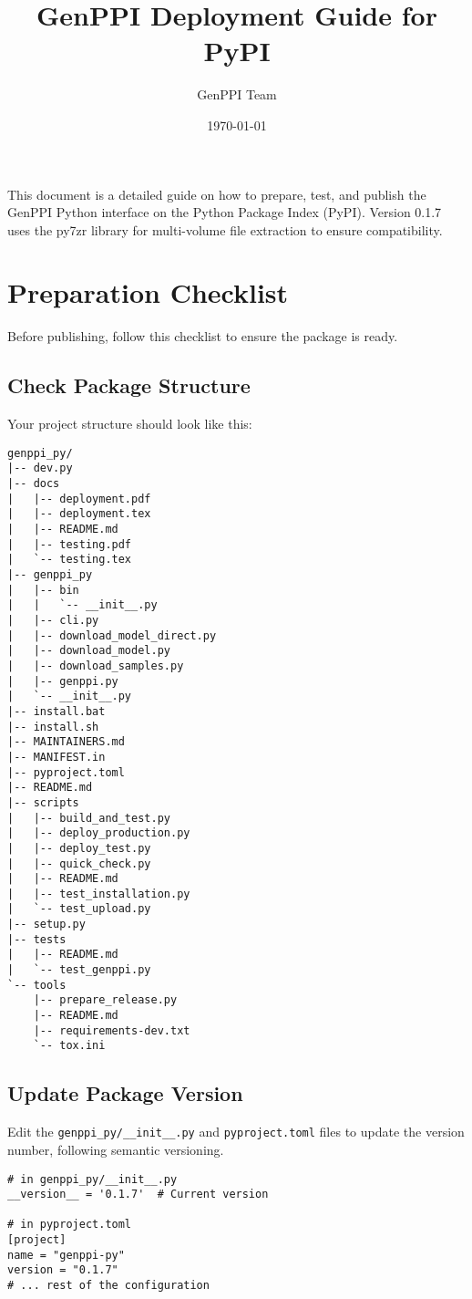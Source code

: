 \documentclass[11pt, a4paper]{article}
\title{\bfseries GenPPI Deployment Guide for PyPI}
\author{GenPPI Team}
\date{\today}
\begin{document}
\maketitle

This document is a detailed guide on how to prepare, test, and publish the GenPPI Python interface on the Python Package Index (PyPI). Version 0.1.7 uses the py7zr library for multi-volume file extraction to ensure compatibility.

\section{Preparation Checklist}

Before publishing, follow this checklist to ensure the package is ready.

\subsection{Check Package Structure}
Your project structure should look like this:
\begin{verbatim}
genppi_py/
|-- dev.py
|-- docs
|   |-- deployment.pdf
|   |-- deployment.tex
|   |-- README.md
|   |-- testing.pdf
|   `-- testing.tex
|-- genppi_py
|   |-- bin
|   |   `-- __init__.py
|   |-- cli.py
|   |-- download_model_direct.py
|   |-- download_model.py
|   |-- download_samples.py
|   |-- genppi.py
|   `-- __init__.py
|-- install.bat
|-- install.sh
|-- MAINTAINERS.md
|-- MANIFEST.in
|-- pyproject.toml
|-- README.md
|-- scripts
|   |-- build_and_test.py
|   |-- deploy_production.py
|   |-- deploy_test.py
|   |-- quick_check.py
|   |-- README.md
|   |-- test_installation.py
|   `-- test_upload.py
|-- setup.py
|-- tests
|   |-- README.md
|   `-- test_genppi.py
`-- tools
    |-- prepare_release.py
    |-- README.md
    |-- requirements-dev.txt
    `-- tox.ini
\end{verbatim}

\subsection{Update Package Version}
Edit the \texttt{genppi\_py/\_\_init\_\_.py} and \texttt{pyproject.toml} files to update the version number, following semantic versioning.
\begin{lstlisting}[style=pythonstyle]
# in genppi_py/__init__.py
__version__ = '0.1.7'  # Current version

# in pyproject.toml
[project]
name = "genppi-py"
version = "0.1.7"
# ... rest of the configuration
\end{lstlisting}
\end{document}
